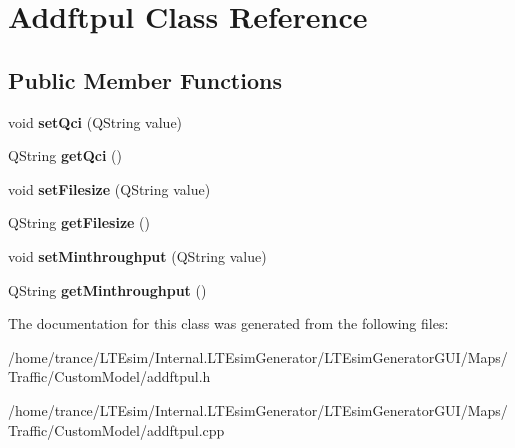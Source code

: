 \hypertarget{class_addftpul}{}\section{Addftpul Class Reference}
\label{class_addftpul}
\subsection*{Public Member Functions}
\begin{DoxyCompactItemize}
\item 
void {\bfseries set\+Qci} (Q\+String value)\hypertarget{class_addftpul_a1e7e4022de1276e4da3448e107bcc4ab}{}\label{class_addftpul_a1e7e4022de1276e4da3448e107bcc4ab}

\item 
Q\+String {\bfseries get\+Qci} ()\hypertarget{class_addftpul_acbdf2d58b27f4e24b33656aaf92bc630}{}\label{class_addftpul_acbdf2d58b27f4e24b33656aaf92bc630}

\item 
void {\bfseries set\+Filesize} (Q\+String value)\hypertarget{class_addftpul_aa1b4996bf303b0a21292f98be1f77c68}{}\label{class_addftpul_aa1b4996bf303b0a21292f98be1f77c68}

\item 
Q\+String {\bfseries get\+Filesize} ()\hypertarget{class_addftpul_aa70abdc1dc21c2b4778efce4e2e529b5}{}\label{class_addftpul_aa70abdc1dc21c2b4778efce4e2e529b5}

\item 
void {\bfseries set\+Minthroughput} (Q\+String value)\hypertarget{class_addftpul_ac768422a8534887ac2abdbe453c9da87}{}\label{class_addftpul_ac768422a8534887ac2abdbe453c9da87}

\item 
Q\+String {\bfseries get\+Minthroughput} ()\hypertarget{class_addftpul_a3dcb2b978a2f5e4136d2ecc1d225c18e}{}\label{class_addftpul_a3dcb2b978a2f5e4136d2ecc1d225c18e}

\end{DoxyCompactItemize}


The documentation for this class was generated from the following files\+:\begin{DoxyCompactItemize}
\item 
/home/trance/\+L\+T\+Esim/\+Internal.\+L\+T\+Esim\+Generator/\+L\+T\+Esim\+Generator\+G\+U\+I/\+Maps/\+Traffic/\+Custom\+Model/addftpul.\+h\item 
/home/trance/\+L\+T\+Esim/\+Internal.\+L\+T\+Esim\+Generator/\+L\+T\+Esim\+Generator\+G\+U\+I/\+Maps/\+Traffic/\+Custom\+Model/addftpul.\+cpp\end{DoxyCompactItemize}
